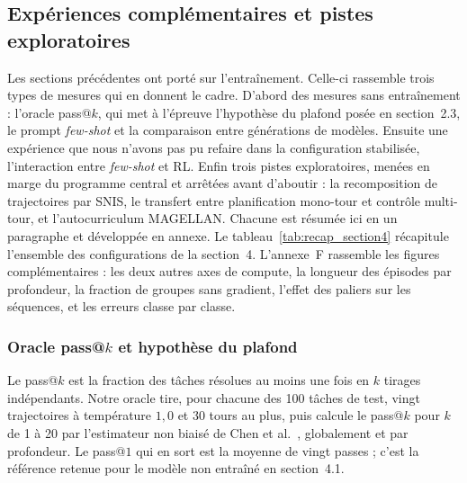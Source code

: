 \documentclass[11pt,a4paper]{article}
\begin{document}
\subsection{Expériences complémentaires et pistes exploratoires}
\label{sec:inference_ablations}

Les sections précédentes ont porté sur l'entraînement. Celle-ci rassemble trois types de mesures qui en donnent le cadre. D'abord des mesures sans entraînement : l'oracle pass@$k$, qui met à l'épreuve l'hypothèse du plafond posée en section~2.3, le prompt \emph{few-shot} et la comparaison entre générations de modèles. Ensuite une expérience que nous n'avons pas pu refaire dans la configuration stabilisée, l'interaction entre \emph{few-shot} et RL. Enfin trois pistes exploratoires, menées en marge du programme central et arrêtées avant d'aboutir : la recomposition de trajectoires par SNIS, le transfert entre planification mono-tour et contrôle multi-tour, et l'autocurriculum MAGELLAN. Chacune est résumée ici en un paragraphe et développée en annexe. Le tableau~\ref{tab:recap_section4} récapitule l'ensemble des configurations de la section~4. L'annexe~F rassemble les figures complémentaires : les deux autres axes de compute, la longueur des épisodes par profondeur, la fraction de groupes sans gradient, l'effet des paliers sur les séquences, et les erreurs classe par classe. 

\subsubsection{Oracle pass@$k$ et hypothèse du plafond}

Le pass@$k$ est la fraction des tâches résolues au moins une fois en $k$ tirages indépendants. Notre oracle tire, pour chacune des 100 tâches de test, vingt trajectoires à température $1{,}0$ et 30 tours au plus, puis calcule le pass@$k$ pour $k$ de 1 à 20 par l'estimateur non biaisé de Chen et al.~\cite{chen2021codex}, globalement et par profondeur. Le pass@$1$ qui en sort est la moyenne de vingt passes ; c'est la référence retenue pour le modèle non entraîné en section~4.1.
\end{document}
